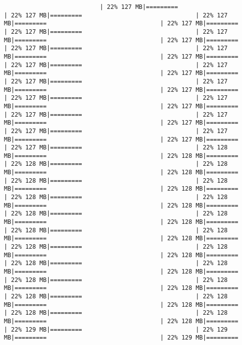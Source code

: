 \documentclass[
]{article}
\begin{document}
\begin{verbatim}
                           | 22% 127 MB|=========                                | 22% 127 MB|=========                                | 22% 127 MB|=========                                | 22% 127 MB|=========                                | 22% 127 MB|=========                                | 22% 127 MB|=========                                | 22% 127 MB|=========                                | 22% 127 MB|=========                                | 22% 127 MB|=========                                | 22% 127 MB|=========                                | 22% 127 MB|=========                                | 22% 127 MB|=========                                | 22% 127 MB|=========                                | 22% 127 MB|=========                                | 22% 127 MB|=========                                | 22% 127 MB|=========                                | 22% 127 MB|=========                                | 22% 127 MB|=========                                | 22% 127 MB|=========                                | 22% 127 MB|=========                                | 22% 127 MB|=========                                | 22% 127 MB|=========                                | 22% 127 MB|=========                                | 22% 127 MB|=========                                | 22% 127 MB|=========                                | 22% 127 MB|=========                                | 22% 128 MB|=========                                | 22% 128 MB|=========                                | 22% 128 MB|=========                                | 22% 128 MB|=========                                | 22% 128 MB|=========                                | 22% 128 MB|=========                                | 22% 128 MB|=========                                | 22% 128 MB|=========                                | 22% 128 MB|=========                                | 22% 128 MB|=========                                | 22% 128 MB|=========                                | 22% 128 MB|=========                                | 22% 128 MB|=========                                | 22% 128 MB|=========                                | 22% 128 MB|=========                                | 22% 128 MB|=========                                | 22% 128 MB|=========                                | 22% 128 MB|=========                                | 22% 128 MB|=========                                | 22% 128 MB|=========                                | 22% 128 MB|=========                                | 22% 128 MB|=========                                | 22% 128 MB|=========                                | 22% 128 MB|=========                                | 22% 128 MB|=========                                | 22% 128 MB|=========                                | 22% 128 MB|=========                                | 22% 128 MB|=========                                | 22% 128 MB|=========                                | 22% 128 MB|=========                                | 22% 128 MB|=========                                | 22% 128 MB|=========                                | 22% 129 MB|=========                                | 22% 129 MB|=========                                | 22% 129 MB|=========                              
\end{verbatim}
\end{document}
